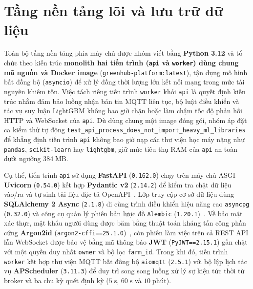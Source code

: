 \section{Tầng nền tảng lõi và lưu trữ dữ liệu}
\label{sec:c2-platform}

Toàn bộ tầng nền tảng phía máy chủ được nhóm viết bằng \textbf{Python 3.12} và tổ chức theo kiến trúc \textbf{monolith hai tiến trình (\texttt{api} và \texttt{worker}) dùng chung mã nguồn và Docker image} (\texttt{greenhub-platform:latest}), tận dụng mô hình bất đồng bộ (\texttt{asyncio}) để xử lý đồng thời lượng lớn kết nối mạng trong mức tài nguyên khiêm tốn. Việc tách riêng tiến trình \texttt{worker} khỏi \texttt{api} là quyết định kiến trúc nhằm đảm bảo luồng nhận bản tin MQTT liên tục, bộ luật điều khiển và tác vụ suy luận LightGBM không bao giờ chặn hoặc làm chậm tốc độ phản hồi HTTP và WebSocket của \texttt{api}. Dù dùng chung một image đóng gói, nhóm áp đặt ca kiểm thử tự động \texttt{test\_api\_process\_does\_not\_import\_heavy\_ml\_libraries} để khẳng định tiến trình \texttt{api} không bao giờ nạp các thư viện học máy nặng như \texttt{pandas}, \texttt{scikit-learn} hay \texttt{lightgbm}, giữ mức tiêu thụ RAM của \texttt{api} an toàn dưới ngưỡng \(384\;\text{MB}\).

Cụ thể, tiến trình \texttt{api} sử dụng \textbf{FastAPI} (\texttt{0.162.0}) chạy trên máy chủ ASGI \textbf{Uvicorn} (\texttt{0.54.0}) kết hợp \textbf{Pydantic v2} (\texttt{2.14.2}) để kiểm tra chặt dữ liệu vào/ra và tự sinh tài liệu đặc tả OpenAPI~\cite{fastapiDocs}. Lớp truy cập cơ sở dữ liệu dùng \textbf{SQLAlchemy 2 Async} (\texttt{2.1.8}) đi cùng trình điều khiển hiệu năng cao \texttt{asyncpg} (\texttt{0.32.0}) và công cụ quản lý phiên bản lược đồ \texttt{Alembic} (\texttt{1.20.1})~\cite{sqlalchemyDocs}. Về bảo mật xác thực, mật khẩu người dùng được băm bằng thuật toán kháng tấn công phần cứng \textbf{Argon2id} (\texttt{argon2-cffi==25.1.0})~\cite{argon2Rfc}, còn phiên làm việc trên cả REST API lẫn WebSocket được bảo vệ bằng mã thông báo \textbf{JWT} (\texttt{PyJWT==2.15.1}) gắn chặt với một quyền duy nhất \texttt{owner} và bộ lọc \texttt{farm\_id}. Trong khi đó, tiến trình \texttt{worker} kết hợp thư viện MQTT bất đồng bộ \texttt{aiomqtt} (\texttt{2.5.1}) với bộ lập lịch tác vụ \textbf{APScheduler} (\texttt{3.11.3}) để duy trì song song luồng xử lý sự kiện tức thời từ broker và ba chu kỳ quét định kỳ (\(5\;\text{s}\), \(60\;\text{s}\) và \(10\;\text{phút}\)).

